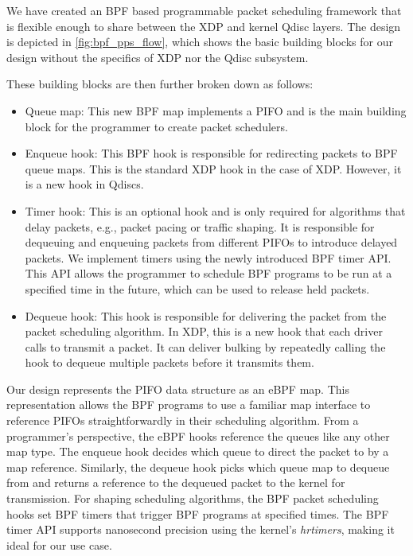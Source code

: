 \documentclass[sigconf, nonacm]{acmart}
\begin{document}
We have created an BPF based programmable packet scheduling framework that is flexible enough to share between the XDP and kernel Qdisc layers. The design is depicted in \cref{fig:bpf_pps_flow}, which shows the basic building blocks for our design without the specifics of XDP nor the Qdisc subsystem.

These building blocks are then further broken down as follows:

\begin{itemize}
        \item Queue map: This new BPF map implements a PIFO and is the main building block for the programmer to create packet schedulers.
        \item Enqueue hook: This BPF hook is responsible for redirecting packets to BPF queue maps. This is the standard XDP hook in the case of XDP. However, it is a new hook in Qdiscs.
        \item Timer hook: This is an optional hook and is only required for algorithms that delay packets, e.g., packet pacing or traffic shaping. It is responsible for dequeuing and enqueuing packets from different PIFOs to introduce delayed packets. We implement timers using the newly introduced BPF timer API. This API allows the programmer to schedule BPF programs to be run at a specified time in the future, which can be used to release held packets.
        \item Dequeue hook: This hook is responsible for delivering the packet from the packet scheduling algorithm. In XDP, this is a new hook that each driver calls to transmit a packet. It can deliver bulking by repeatedly calling the hook to dequeue multiple packets before it transmits them.
\end{itemize}

Our design represents the PIFO data structure as an eBPF map. This representation allows the BPF programs to use a familiar map interface to reference PIFOs straightforwardly in their scheduling algorithm. From a programmer's perspective, the eBPF hooks reference the queues like any other map type. The enqueue hook decides which queue to direct the packet to by a map reference. Similarly, the dequeue hook picks which queue map to dequeue from and returns a reference to the dequeued packet to the kernel for transmission. For shaping scheduling algorithms, the BPF packet scheduling hooks set BPF timers that trigger BPF programs at specified times. The BPF timer API supports nanosecond precision using the kernel's \textit{hrtimers}, making it ideal for our use case.
\end{document}
